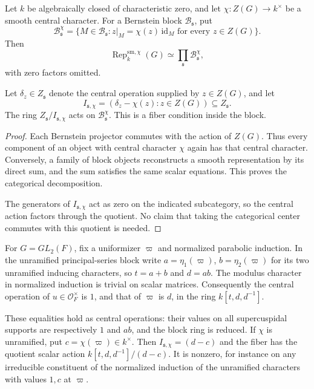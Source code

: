 \begin{proposition}
\label{v4-arith:ic:w5-f:F1a3-AB:prop:block-chi-compat}

Let \(k\) be algebraically closed of characteristic
zero, and let \(\chi:Z(G)\to k^\times\) be a smooth
central character. For a Bernstein block
\(\mathcal B_{\mathfrak s}\), put
\[
 \mathcal B_{\mathfrak s}^{\chi}
 =\{M\in\mathcal B_{\mathfrak s}:
        z|_M=\chi(z)\,\mathrm{id}_M
        \text{ for every }z\in Z(G)\}.
\]
Then
\[
 \operatorname{Rep}^{\mathrm{sm},\chi}_k(G)
   \simeq \prod_{\mathfrak s}
                     \mathcal B_{\mathfrak s}^{\chi},
\]
with zero factors omitted.

Let \(\delta_z\in Z_{\mathfrak s}\) denote the
central operation supplied by \(z\in Z(G)\), and
let
\[
 I_{\mathfrak s,\chi}
   =(\delta_z-\chi(z):z\in Z(G))
       \subseteq Z_{\mathfrak s}.
\]
The ring \(Z_{\mathfrak s}/I_{\mathfrak s,\chi}\)
acts on \(\mathcal B_{\mathfrak s}^{\chi}\).
This is a fiber condition inside the block.
\end{proposition}

\begin{proof}
Each Bernstein projector commutes with the action
of \(Z(G)\). Thus every component of an object
with central character \(\chi\) again has that
central character. Conversely, a family of block objects reconstructs a smooth
representation by its direct sum, and the sum satisfies the same
scalar equations. This proves the
categorical decomposition.

The generators of \(I_{\mathfrak s,\chi}\)
act as zero on the indicated subcategory, so
the central action factors through the quotient.
No claim that taking the categorical center
commutes with this quotient is needed.
\end{proof}

For $G=GL_2(F)$, fix a uniformizer $\varpi$ and normalized
parabolic induction. In the unramified principal-series block write
$a=\eta_1(\varpi)$, $b=\eta_2(\varpi)$ for its two unramified
inducing characters, so $t=a+b$ and $d=ab$. The modulus character
in normalized induction is trivial on scalar matrices. Consequently
the central operation of $u\in\mathcal O_F^\times$ is $1$, and that
of $\varpi$ is $d$, in the ring $k[t,d,d^{-1}]$.

These equalities
hold as central operations: their values on all supercuspidal supports
are respectively $1$ and $ab$, and the block ring is reduced.
If $\chi$ is unramified, put $c=\chi(\varpi)\in k^\times$.
Then $I_{\mathfrak s,\chi}=(d-c)$ and the fiber has the quotient
scalar action $k[t,d,d^{-1}]/(d-c)$. It is nonzero, for instance on
any irreducible constituent of the normalized induction of the
unramified characters with values $1,c$ at $\varpi$.

